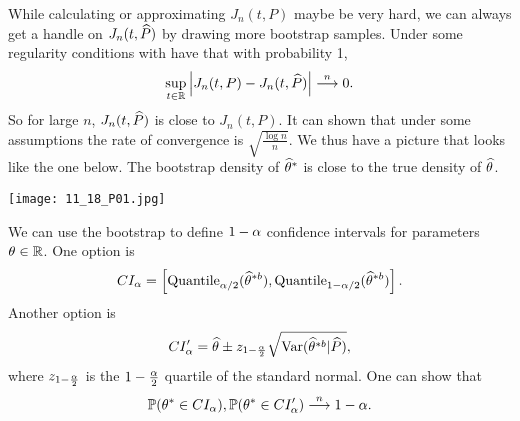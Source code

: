 While calculating or approximating $J_n(t,P)$ maybe be very hard, we can always get a handle on $J_n(t,\widehat{P})$ by drawing more bootstrap samples. Under some regularity conditions with have that with probability 1,
\[\sup_{t \in {\mathbb R}} {\left\lvert J_n(t,P)-J_n(t,\widehat{P})\right\rvert} \stackrel{n}{\longrightarrow} 0.\]
So for large $n$, $J_n(t,\widehat{P})$ is close to $J_n(t, P)$. It can shown that under some assumptions the rate of convergence is $\sqrt{\frac{\log n}{n}}$. We thus have a picture that looks like the one below. The bootstrap density of $\widehat{{\theta}}^*$ is close to the true density of $\widehat{{\theta}}$. 

\begin{center}
    \texttt{[image: 11\_18\_P01.jpg]}
\end{center}

We can  use the bootstrap to define $1-{\alpha}$ confidence intervals for parameters ${\theta} \in {\mathbb R}$. One option is 
\[CI_{\alpha} = \left[\text{Quantile}_{{\alpha}/2}(\widehat{{\theta}}^{*b}),\text{Quantile}_{1-{\alpha}/2}(\widehat{{\theta}}^{*b})\right].\]
Another option is 
\[CI_{\alpha}' = \widehat{{\theta}}\pm z_{1-\frac{{\alpha}}{2}}\sqrt{\operatorname{Var}(\widehat{{\theta}}^{*b}|\widehat{P})},\]
where $z_{1-\frac{{\alpha}}{2}}$ is the $1-\frac{{\alpha}}{2}$ quartile of the standard normal. One can show that 
\[{\mathbb{P}}({\theta}^* \in CI_{\alpha}), {\mathbb{P}}({\theta}^* \in CI_{\alpha}') \stackrel{n}{\longrightarrow} 1-{\alpha}. \]

